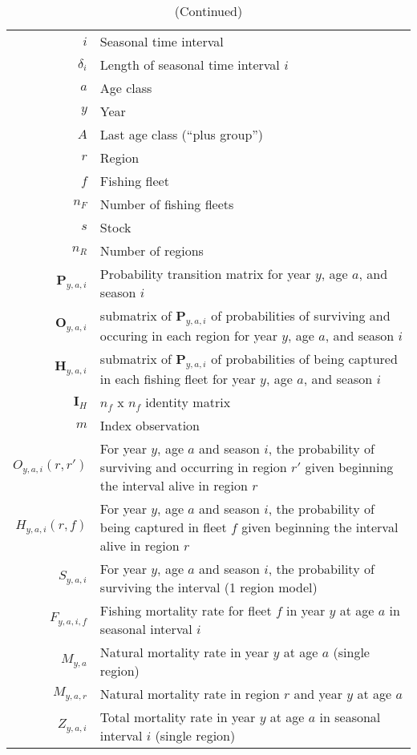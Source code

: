 \begin{longtable}[c]{r p{}}
\caption{Definition of terms.\label{symbols}}%
\\ \hline \hline \endfirsthead 
\caption[]{(Continued)} %
\\ \hline \hline \endhead
 \hline \hline \endfoot
$i$ & Seasonal time interval\\
$\delta_i$ & Length of seasonal time interval $i$\\
$a$ & Age class\\
$y$ & Year\\
$A$ & Last age class (``plus group'')\\
$r$ & Region\\
$f$ & Fishing fleet\\
$n_F$ & Number of fishing fleets\\
$s$ & Stock\\
$n_R$ & Number of regions\\
$\mathbf{P}_{y,a,i}$ & Probability transition matrix for year $y$, age $a$, and season $i$\\
$\mathbf{O}_{y,a,i}$ & submatrix of $\mathbf{P}_{y,a,i}$ of probabilities of surviving and occuring in each region for year $y$, age $a$, and season $i$\\
$\mathbf{H}_{y,a,i}$ & submatrix of $\mathbf{P}_{y,a,i}$ of probabilities of being captured in each fishing fleet for year $y$, age $a$, and season $i$\\
$\mathbf{I}_{H}$ & $n_f$ x $n_f$ identity matrix \\
$m$ & Index observation\\
$O_{y,a,i}(r,r')$ & For year $y$, age $a$ and season $i$, the probability of surviving and occurring in region $r'$ given beginning the interval alive in region $r$\\
$H_{y,a,i}(r,f)$ & For year $y$, age $a$ and season $i$, the probability of being captured in fleet $f$ given beginning the interval alive in region $r$\\
$S_{y,a,i}$ & For year $y$, age $a$ and season $i$, the probability of surviving the interval (1 region model)\\
$F_{y,a,i,f}$ & Fishing mortality rate for fleet $f$ in year $y$ at age $a$ in seasonal interval $i$\\
$M_{y,a}$ &  Natural mortality rate in year $y$ at age $a$ (single region)\\
$M_{y,a,r}$ & Natural mortality rate in region $r$ and year $y$ at age $a$\\
$Z_{y,a,i}$ & Total mortality rate in year $y$ at age $a$ in seasonal interval $i$ (single region)\\

\end{longtable}
